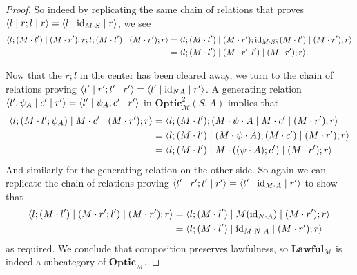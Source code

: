 \documentclass[11pt,letterpaper]{article}
\theoremstyle{plain}
\theoremstyle{definition}
\newcommand{\M}{\mathscr{M}}
\newcommand{\Optic}{\mathbf{Optic}}
\newcommand{\Twoptic}{\mathbf{Optic}^2}
\newcommand{\Lawful}{\mathbf{Lawful}}
\newcommand{\id}{\mathrm{id}}
\newcommand{\act}{\cdot}
\newcommand{\repthree}[3]{{\ensuremath \langle #1 \mid #2 \mid #3 \rangle}}
\begin{document}
\begin{proof}
  So indeed by replicating the same chain of relations that proves $\repthree{l}{r;l}{r} =\repthree{l}{\id_{M \act S}}{r}$, we see
  \begin{align*}
    \repthree{l;(M \act l')}{(M \act r');r;l;(M \act l')}{(M \act r') ; r} 
    &= \repthree{l;(M \act l')}{(M \act r');\id_{M \act S};(M \act l')}{(M \act r') ; r} \\
    &= \repthree{l;(M \act l')}{(M \act r';l')}{(M \act r') ; r}.
  \end{align*}

  Now that the $r;l$ in the center has been cleared away, we turn to the chain of relations proving $\repthree{l'}{r';l'}{r'} = \repthree{l'}{\id_{NA}}{r'}$. A generating relation $\repthree{l';\psi_A}{c'}{r'} = \repthree{l'}{\psi_A ; c'}{r'}$ in $\Twoptic_\M(S, A)$ implies that
  \begin{align*}
    \repthree{l;(M \act l';\psi_A)}{M \act c'}{(M \act r') ; r}
    &= \repthree{l;(M\act l');(M \act \psi \act A}{M \act c'}{(M \act r') ; r} \\
    &= \repthree{l;(M \act l')}{(M \act \psi \act A) ; (M \act c')}{(M\act r') ; r} \\
    &= \repthree{l;(M \act l')}{M \act ((\psi \act A);c')}{(M \act r') ; r}
  \end{align*}
  And similarly for the generating relation on the other side. So again we can replicate the chain of relations proving $\repthree{l'}{r';l'}{r'} = \repthree{l'}{\id_{M\act A}}{r'}$ to show that
  \begin{align*}
    \repthree{l;(M \act l')}{(M \act r';l')}{(M \act r') ; r} 
    &= \repthree{l;(M \act l')}{M(\id_{N\act A})}{(M \act r') ; r} \\
    &= \repthree{l;(M \act l')}{\id_{M \act N \act A}}{(M \act r') ; r}
  \end{align*}
as required. We conclude that composition preserves lawfulness, so $\Lawful_\M$ is indeed a subcategory of $\Optic_\M$.
\end{proof}
\end{document}
